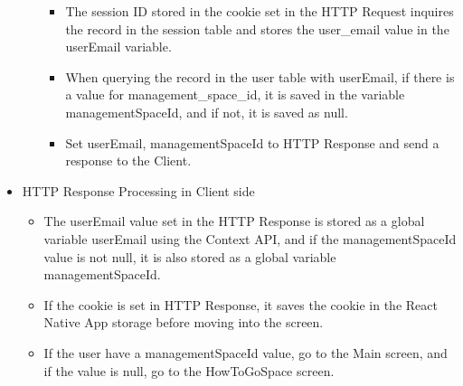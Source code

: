 \documentclass[conference]{IEEEtran}
\begin{document}
\begin{itemize}
\begin{itemize}
        \begin{itemize}
            \item The session ID stored in the cookie set in the HTTP Request inquires the record in the session table and stores the user\_email value in the userEmail variable.
            \item When querying the record in the user table with userEmail, if there is a value for management\_space\_id, it is saved in the variable managementSpaceId, and if not, it is saved as null.
            \item Set userEmail, managementSpaceId to HTTP Response and send a response to the Client.
            \\
        \end{itemize}
    \end{itemize}
    \item HTTP Response Processing in Client side
    \begin{itemize}
        \item The userEmail value set in the HTTP Response is stored as a global variable userEmail using the Context API, and if the managementSpaceId value is not null, it is also stored as a global variable managementSpaceId.
        \item If the cookie is set in HTTP Response, it saves the cookie in the React Native App storage before moving into the screen.
        \item If the user have a managementSpaceId value, go to the Main screen, and if the value is null, go to the HowToGoSpace screen.
        \\
    \end{itemize}
\end{itemize}
\end{document}
